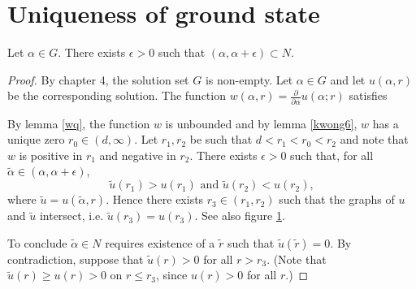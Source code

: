 \newpage \section{Uniqueness of ground state}

\begin{lemma} Let $\alpha\in G$. There exists $\epsilon>0$ such that $(\alpha,\alpha+\epsilon)\subset N$.
\begin{proof} By chapter 4, the solution set $G$ is non-empty. Let $\alpha\in G$ and let $u(\alpha,r)$ be the corresponding solution.  The function $w(\alpha,r)=\frac{\partial}{\partial\alpha}u(\alpha;r)$ satisfies

By lemma \ref{wq}, the function $w$ is unbounded and by lemma \ref{kwong6}, $w$ has a unique zero $r_0\in(d,\infty)$. Let $r_1,r_2$ be such that $d<r_1<r_0<r_2$ and note that $w$ is positive in $r_1$ and negative in $r_2$. There exists $\epsilon>0$ such that, for all $\tilde\alpha\in(\alpha,\alpha+\epsilon)$,$$\tilde u(r_1)>u(r_1)\text{ and }\tilde u(r_2)<u(r_2),$$ where $\tilde u=u(\tilde\alpha,r)$. Hence there exists $r_3\in(r_1,r_2)$ such that the graphs of $u$ and $\tilde u$ intersect, i.e. $\tilde u(r_3)=u(r_3)$. See also figure \ref{}.

To conclude $\tilde\alpha\in N$ requires existence of a $\tilde r$ such that $\tilde u(\tilde r)=0$. By contradiction, suppose that $\tilde u(r)>0$ for all $r>r_3$. (Note that $\tilde u(r)\geq u(r)>0$ on $r\leq r_3$, since $u(r)>0$ for all $r$.)


\end{proof}
\end{lemma}
